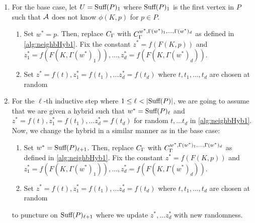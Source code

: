 \begin{itemize}
		\begin{enumerate}
			\item For the base case, 
			let $U = \text{Suff}(P)_1$
			where $\text{Suff}(P)_1$ is the first vertex in $P$ such that $\mathcal{A}$ does not know $\phi(K, p)$ for $p \in P$.
				\begin{enumerate}[label=(\alph*)]
					\item Set $w^* = p$. Then, replace $C_\Gamma$ with $C_\Gamma^{w^*, \Gamma(w^*)_1, \dots, \Gamma(w^*)_d}$ as defined in \cref{alg:neighbHyb1}.
					Fix the constant $z^* = f(F(K, p))$ and $z^*_1 = f(F(K, \Gamma(w^*)_1)), \dots, z^*_d = f(F(K, \Gamma(w^*)_d))$.
					\item Set $z^* = f(t), z^*_1 = f(t_1), \dots z^*_d = f(t_d)$ where $t, t_1, \dots, t_d$ are chosen at random %
				\end{enumerate}
			\item For the $\ell$-th inductive step where $1 \leq \ell < |\text{Suff}(P)|$, we are going to assume that we are given a hybrid such that 
			$w^* = \text{Suff}(P)_{\ell}$ and $z^* = f(t), z^*_1 = f(t_1), \dots z^*_d = f(t_d)$ for random $t, \dots t_d$ in \cref{alg:neighbHyb1}.
			Now, we change the hybrid in a similar manner as in the base case:
			\begin{enumerate}[label=(\alph*)]
				\item Set $w^* = \text{Suff}(P)_{\ell + 1}$. Then, replace $C_\Gamma$ with $C_\Gamma^{w^*, \Gamma(w^*)_1, \dots, \Gamma(w^*)_d}$ as defined in \cref{alg:neighbHyb1}.
				Fix the constant $z^* = f(F(K, p))$ and $z^*_1 = f(F(K, \Gamma(w^*)_1)), \dots, z^*_d = f(F(K, \Gamma(w^*)_d))$.
				\item Set $z^* = f(t), z^*_1 = f(t_1), \dots z^*_d = f(t_d)$ where $t, t_1, \dots, t_d$ are chosen at random %
			\end{enumerate}
			to puncture on $\text{Suff}(P)_{\ell + 1}$ where we update $z^*, \dots z^*_d$ 
			with new randomness.
			
		\end{enumerate}
	\end{itemize}
